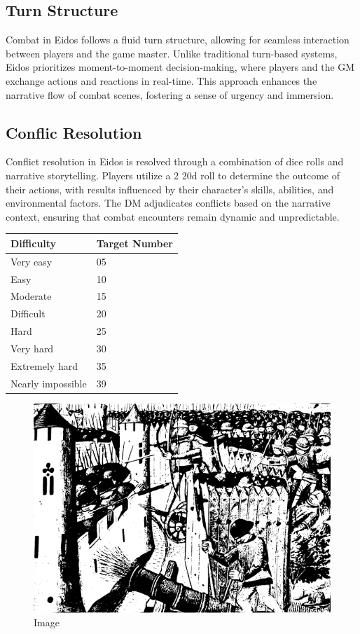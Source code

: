 \hypertarget{turn-structure}{%
\subsection{Turn Structure}\label{turn-structure}}

Combat in Eidos follows a fluid turn structure, allowing for seamless
interaction between players and the game master. Unlike traditional
turn-based systems, Eidos prioritizes moment-to-moment decision-making,
where players and the GM exchange actions and reactions in real-time.
This approach enhances the narrative flow of combat scenes, fostering a
sense of urgency and immersion.

\hypertarget{conflic-resolution}{%
\subsection{Conflic Resolution}\label{conflic-resolution}}

Conflict resolution in Eidos is resolved through a combination of dice
rolls and narrative storytelling. Players utilize a 2 20d roll to
determine the outcome of their actions, with results influenced by their
character's skills, abilities, and environmental factors. The DM
adjudicates conflicts based on the narrative context, ensuring that
combat encounters remain dynamic and unpredictable.

\begin{longtable}[]{@{}ll@{}}
\toprule
Difficulty & Target Number \\
\midrule
\endhead
Very easy & 05 \\
Easy & 10 \\
Moderate & 15 \\
Difficult & 20 \\
Hard & 25 \\
Very hard & 30 \\
Extremely hard & 35 \\
Nearly impossible & 39 \\
\bottomrule
\end{longtable}

\begin{figure}
\centering
\includegraphics{./images/combat02.pdf}
\caption{Image}
\end{figure}

